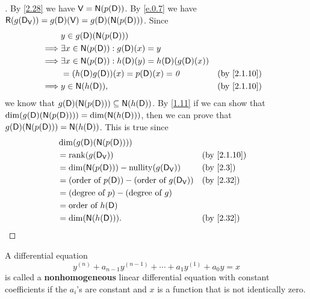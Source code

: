 \begin{proof}[]
	By \cref{2.28} we have \(\V = \ns{p(\Dop)}\).
	By \cref{e.0.7} we have \(\rg{g(\Dop_{\V})} = g(\Dop)(\V) = g(\Dop)(\ns{p(\Dop)})\).
	Since
	\begin{align*}
		         & y \in g(\Dop)(\ns{p(\Dop)})                                                    \\
		\implies & \exists x \in \ns{p(\Dop)} : g(\Dop)(x) = y                                    \\
		\implies & \exists x \in \ns{p(\Dop)} : h(\Dop)(y) = h(\Dop)(g(\Dop)(x))                  \\
		         & = (h(\Dop) g(\Dop))(x) = p(\Dop)(x) = \zv                     &  & \by{2.1.10} \\
		\implies & y \in \ns{h(\Dop)},                                           &  & \by{2.1.10}
	\end{align*}
	we know that \(g(\Dop)(\ns{p(\Dop)}) \subseteq \ns{h(\Dop)}\).
	By \cref{1.11} if we can show that \(\dim(g(\Dop)(\ns{p(\Dop)})) = \dim(\ns{h(\Dop)})\), then we can prove that \(g(\Dop)(\ns{p(\Dop)}) = \ns{h(\Dop)}\).
	This is true since
	\begin{align*}
		 & \dim(g(\Dop)(\ns{p(\Dop)}))                                                     \\
		 & = \rk{g(\Dop_{\V})}                                            &  & \by{2.1.10} \\
		 & = \dim(\ns{p(\Dop)}) - \nt{g(\Dop_{\V})}                       &  & \by{2.3}    \\
		 & = (\text{order of } p(\Dop)) - (\text{order of } g(\Dop_{\V})) &  & \by{2.32}   \\
		 & = (\text{degree of } p) - (\text{degree of } g)                                 \\
		 & = \text{order of } h(\Dop)                                                      \\
		 & = \dim(\ns{h(\Dop)}).                                          &  & \by{2.32}
	\end{align*}
\end{proof}

\begin{defn}\label{2.7.16}
	A differential equation
	\[
		y^{(n)} + a_{n - 1} y^{(n - 1)} + \cdots + a_1 y^{(1)} + a_0 y = x
	\]
	is called a \textbf{nonhomogeneous} linear differential equation with constant coefficients if the \(a_i\)'s are constant and \(x\) is a function that is not identically zero.
\end{defn}

